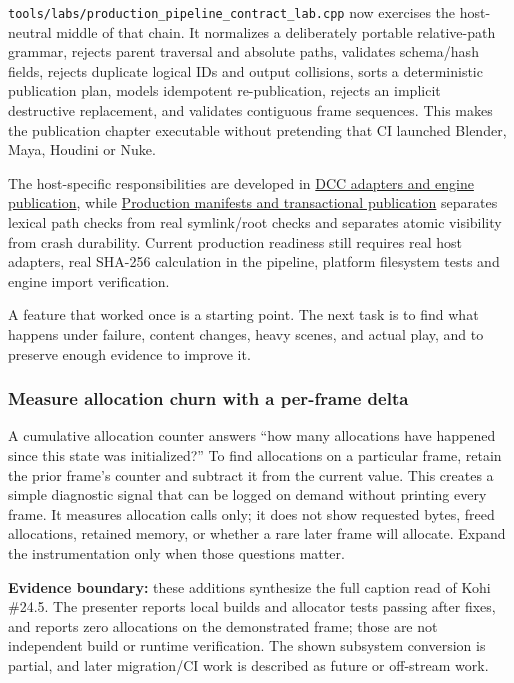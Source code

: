 \texttt{tools/labs/production\_pipeline\_contract\_lab.cpp} now exercises the host-neutral middle of that chain. It normalizes a deliberately portable relative-path grammar, rejects parent traversal and absolute paths, validates schema/hash fields, rejects duplicate logical IDs and output collisions, sorts a deterministic publication plan, models idempotent re-publication, rejects an implicit destructive replacement, and validates contiguous frame sequences. This makes the publication chapter executable without pretending that CI launched Blender, Maya, Houdini or Nuke.

The host-specific responsibilities are developed in \hyperref[appendix-03ade9e1875f]{DCC adapters and engine publication}, while \hyperref[appendix-91eaa3cbdbc3]{Production manifests and transactional publication} separates lexical path checks from real symlink/root checks and separates atomic visibility from crash durability. Current production readiness still requires real host adapters, real SHA-256 calculation in the pipeline, platform filesystem tests and engine import verification.

A feature that worked once is a starting point. The next task is to find what happens under failure, content changes, heavy scenes, and actual play, and to preserve enough evidence to improve it.

\subsubsection{Measure allocation churn with a per-frame delta}\label{06-engine-ii-ch041-measure-allocation-churn-with-a-per-frame-delta}

A cumulative allocation counter answers ``how many allocations have happened since this state was initialized?'' To find allocations on a particular frame, retain the prior frame's counter and subtract it from the current value. This creates a simple diagnostic signal that can be logged on demand without printing every frame. It measures allocation calls only; it does not show requested bytes, freed allocations, retained memory, or whether a rare later frame will allocate. Expand the instrumentation only when those questions matter.

\textbf{Evidence boundary:} these additions synthesize the full caption read of Kohi \#24.5. The presenter reports local builds and allocator tests passing after fixes, and reports zero allocations on the demonstrated frame; those are not independent build or runtime verification. The shown subsystem conversion is partial, and later migration/CI work is described as future or off-stream work.

